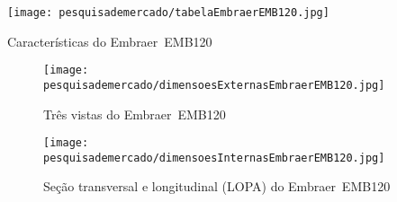 \begin{table}
\centering
\texttt{[image: pesquisademercado/tabelaEmbraerEMB120.jpg]}
\caption{Características do Embraer~EMB120}
\end{table}

\begin{sidewaysfigure}[p]
\texttt{[image: pesquisademercado/dimensoesExternasEmbraerEMB120.jpg]}
\caption{Três vistas do Embraer~EMB120}
\end{sidewaysfigure}

\begin{sidewaysfigure}[p]
\texttt{[image: pesquisademercado/dimensoesInternasEmbraerEMB120.jpg]}
\caption{Seção transversal e longitudinal (LOPA) do Embraer~EMB120}
\end{sidewaysfigure}

